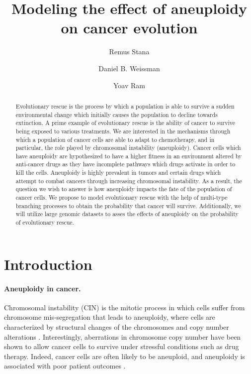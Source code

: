 \documentclass[12pt]{extarticle}
\title{Modeling the effect of aneuploidy on cancer evolution}
\author[1]{Remus Stana}
\author[2]{Daniel B. Weissman}
\author[1,*]{Yoav Ram}
\affil[1]{School of Zoology, Tel Aviv University}
\affil[2]{Department of Physics, Emory University}
\affil[*]{Corresponding author: yoav@yoavram.com}
\begin{document}
\maketitle

\begin{abstract}
Evolutionary rescue is the process by which a population is able to survive a sudden environmental change which initially causes the population to decline towards extinction. A prime example of evolutionary rescue is the ability of cancer to survive being exposed to various treatments. We are interested in the mechanisms through which a population of cancer cells are able to adapt to chemotherapy, and in particular, the role played by chromosomal instability (aneuploidy). Cancer cells which have aneuploidy are hypothesized to have a higher fitness in an environment altered by anti-cancer drugs as they have incomplete pathways which drugs activate in order to kill the cells. Aneuploidy is highly prevalent in tumors and certain drugs which attempt to combat cancers through increasing chromosomal instability. As a result, the question we wish to answer is how aneuploidy impacts the fate of the population of cancer cells. We propose to model evolutionary rescue with the help of multi-type branching processes to obtain the probability that cancer will survive. Additionally, we will utilize large genomic datasets to asses the effects of aneuploidy on the probability of evolutionary rescue.
\end{abstract}

\newpage
\section*{Introduction}




\paragraph{Aneuploidy in cancer.} Chromosomal instability (CIN) is the mitotic process in which cells suffer from chromosome mis-segregation that leads to aneuploidy, where cells are characterized by structural changes of the chromosomes and copy number alterations \cite{schukken2018cin}.
Interestingly, aberrations in chromosome copy number have been shown to allow cancer cells to survive under stressful conditions such as drug therapy.
Indeed, cancer cells are often likely to be aneuploid, and aneuploidy is associated with poor patient outcomes \cite{ben2020context}.
\end{document}
